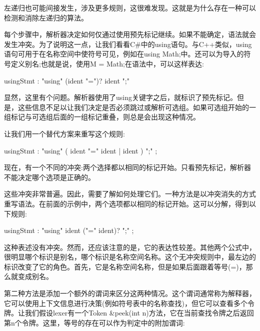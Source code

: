 左递归也可能间接发生，涉及更多规则，这很难发现。这就是为什么存在一种可以检测和消除左递归的算法。\par

每个步骤中，解析器决定如何仅通过使用预先标记继续。如果不能确定，语法就会发生冲突。为了说明这一点，让我们看看C\#中的using语句。与C++类似，using语句可用于在名称空间中使符号可见，例如在using Math;中。还可以为导入的符号定义别名;也就是说，使用M = Math;在语法中，可以这样表达:\par

\begin{tcolorbox}[colback=white,colframe=black]
usingStmt : "using" (ident "=")? ident ";"
\end{tcolorbox}

显然，这里有个问题。解析器使用了using关键字之后，就标识了预先标记。但是，这些信息不足以让我们决定是否必须跳过或解析可选组。如果可选组开始的一组标记与可选组后面的一组标记重叠，则总是会出现这种情况。\par

让我们用一个替代方案来重写这个规则:\par


\begin{tcolorbox}[colback=white,colframe=black]
usingStmt : "using" ( ident "=" ident | ident ) ";" ;
\end{tcolorbox}

现在，有一个不同的冲突:两个选择都以相同的标记开始。只看预先标记，解析器不能决定哪个选项是正确的。\par

这些冲突非常普遍。因此，需要了解如何处理它们。一种方法是以冲突消失的方式重写语法。在前面的示例中，两个选项都以相同的标记开始。这可以分解，得到以下规则:\par

\begin{tcolorbox}[colback=white,colframe=black]
usingStmt : "using" ident ("=" ident)? ";" ;
\end{tcolorbox}

这种表述没有冲突。然而，还应该注意的是，它的表达性较差。其他两个公式中，很明显哪个标识是别名，哪个标识是名称空间名称。这个无冲突规则中，最左边的标识改变了它的角色。首先，它是名称空间名称，但是如果后面跟着等号(=)，那么就变成别名。\par

第二种方法是添加一个额外的谓词来区分这两种情况。这个谓词通常称为解释器，它可以使用上下文信息进行决策(例如符号表中的名称查找)，但它可以查看多个令牌。让我们假设lexer有一个Token \&peek(int n)方法，它在当前查找令牌之后返回第n个令牌。这里，等号的存在可以作为判定中的附加谓词:\par

